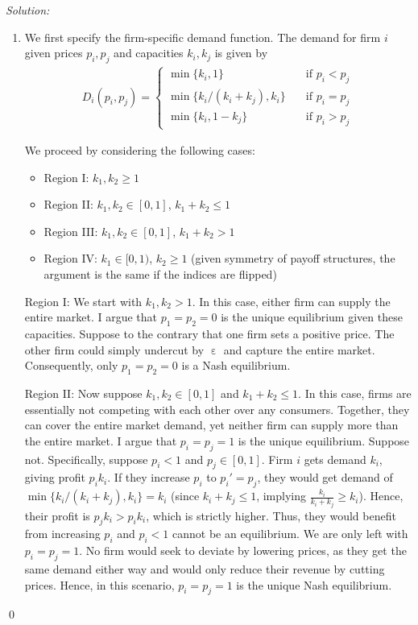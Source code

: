 \documentclass[12pt]{article}
\DeclareMathOperator{\eps}{\varepsilon}
\newenvironment{sol}
    {\emph{Solution:}
    }
    {
    \qed
    }
\begin{document}
\begin{sol}
\begin{enumerate}[label=\alph*) ]
    \item We first specify the firm-specific demand function. The demand for firm $i$ given prices $p_i, p_j$ and capacities $k_i, k_j$ is given by
    \begin{align*}
        D_i(p_i, p_j) = \begin{cases} \min\{k_i, 1\} \quad&\text{if } p_i < p_j\\
            \min\{k_i/(k_i + k_j), k_i\} \quad&\text{if } p_i = p_j\\
            \min\{k_i, 1- k_j\} \quad&\text{if } p_i > p_j
        \end{cases}
    \end{align*}
    
    We proceed by considering the following cases:
    \begin{itemize}
        \item Region I: $k_1, k_2 \geq 1$
        \item Region II: $k_1, k_2 \in [0,1]$, $k_1 + k_2 \leq 1$
        \item Region III: $k_1, k_2 \in [0,1]$, $k_1 + k_2 > 1$
        \item Region IV: $k_1 \in [0,1)$, $k_2 \geq 1$ (given symmetry of payoff structures, the argument is the same if the indices are flipped)
    \end{itemize}
    Region I: We start with $k_1, k_2 > 1$. In this case, either firm can supply the entire market. I argue that $p_1 = p_2 = 0$ is the unique equilibrium given these capacities. Suppose to the contrary that one firm sets a positive price. The other firm could simply undercut by $\eps$ and capture the entire market. Consequently, only $p_1 = p_2 = 0$ is a Nash equilibrium.

    Region II: Now suppose $k_1, k_2 \in [0,1]$ and $k_1 + k_2 \leq 1$. In this case, firms are essentially not competing with each other over any consumers. Together, they can cover the entire market demand, yet neither firm can supply more than the entire market. I argue that $p_i = p_j = 1$ is the unique equilibrium. Suppose not. Specifically, suppose $p_i < 1$ and $p_j \in [0,1]$. Firm $i$ gets demand $k_i$, giving profit $p_i k_i$. If they increase $p_i$ to $p_i' = p_j$, they would get demand of $\min\{k_i /(k_i + k_j), k_i\} = k_i$ (since $k_i + k_j \leq 1$, implying $\frac{k_i}{k_i + k_j} \geq k_i$). Hence, their profit is $p_j k_i > p_i k_i$, which is strictly higher. Thus, they would benefit from increasing $p_i$ and $p_i < 1$ cannot be an equilibrium. We are only left with $p_i = p_j = 1$. No firm would seek to deviate by lowering prices, as they get the same demand either way and would only reduce their revenue by cutting prices. Hence, in this scenario, $p_i = p_j = 1$ is the unique Nash equilibrium.


\end{enumerate}
\end{sol}
\end{document}
